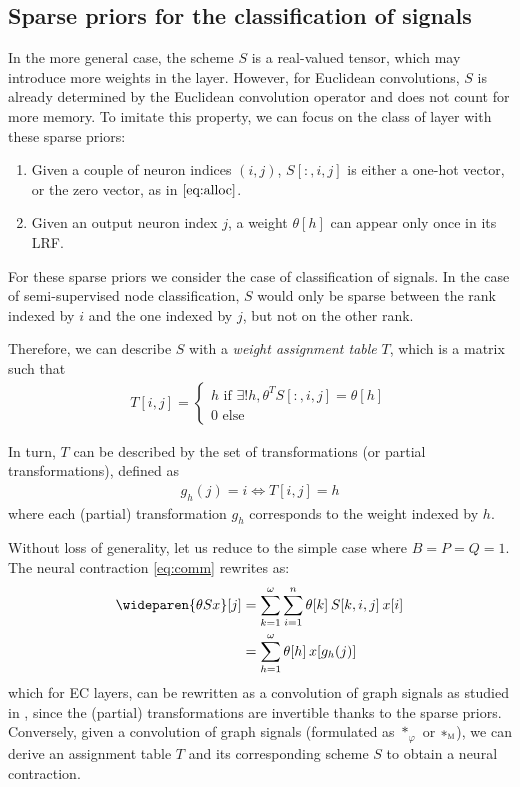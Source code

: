 \subsection{Sparse priors for the classification of signals}
\label{sec:sparse}

In the more general case, the scheme $S$ is a real-valued tensor, which may introduce more weights in the layer. However, for Euclidean convolutions, $S$ is already determined by the Euclidean convolution operator and does not count for more memory. To imitate this property, we can focus on the class of layer with these sparse priors:
\begin{enumerate}
  \item Given a couple of neuron indices $(i,j)$, $S[:,i,j]$ is either a one-hot vector, or the zero vector, as in $\eqref{eq:alloc}$.
  \item Given an output neuron index $j$, a weight $\theta[h]$ can appear only once in its LRF.
\end{enumerate}

\begin{remark}
For these sparse priors we consider the case of classification of signals. In the case of semi-supervised node classification, $S$ would only be sparse between the rank indexed by $i$ and the one indexed by $j$, but not on the other rank.
\end{remark}

Therefore, we can describe $S$ with a \emph{weight assignment table} $T$, which is a matrix such that
\begin{gather}
T[i,j] = \begin{cases}h \text{ if } \exists! h, \theta^T S[:,i,j] = \theta[h]\\ 0 \text{ else}\end{cases}
\end{gather}

In turn, $T$ can be described by the set of transformations (or partial transformations), defined as
\begin{gather}
g_h(j) = i \Leftrightarrow T[i,j] = h
\end{gather}
where each (partial) transformation $g_h$ corresponds to the weight indexed by $h$.

Without loss of generality, let us reduce to the simple case where $B=P=Q=1$. The neural contraction \eqref{eq:comm} rewrites as:
\begin{align}
\wideparen{\theta Sx}[j] & = \displaystyle \sum_{k=1}^\omega \sum_{i=1}^n \theta[k] \h{2} S[k,i,j] \h{2} x[i]\\
                         & = \displaystyle \sum_{h=1}^\omega \theta[h] \h{2} x[g_h(j)]%
\end{align}
which for EC layers, can be rewritten as a convolution of graph signals as studied in , since the (partial) transformations are invertible thanks to the sparse priors. Conversely, given a convolution of graph signals (formulated as $\ast_\varphi$ or $\ast_{\operatorname{\textsc{m}}}$), we can derive an assignment table $T$ and its corresponding scheme $S$ to obtain a neural contraction.

